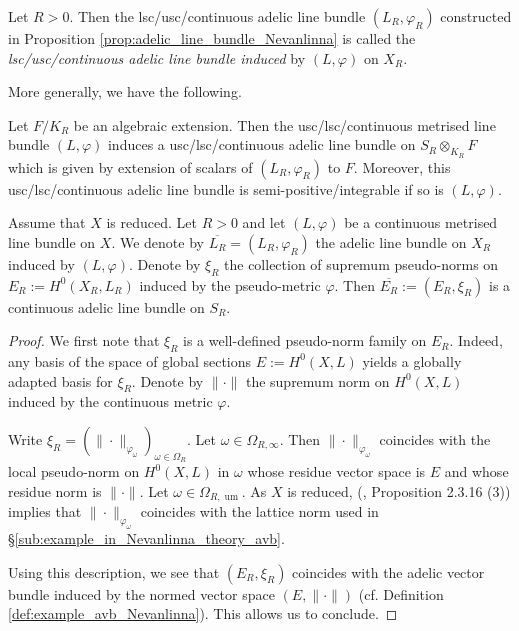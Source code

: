 \documentclass [11pt,reqno]{amsart}
\newcommand{\1}{\mathmybb{1}}
\def\um{\operatorname{um}}
\begin{document}
\begin{definition}
\label{def:adelic_line_bundle_Nevanlinna}
Let $R>0$. Then the lsc/usc/continuous adelic line bundle $(L_{R},\varphi_{R})$ constructed in Proposition \ref{prop:adelic_line_bundle_Nevanlinna} is called the \emph{lsc/usc/continuous adelic line bundle induced} by $(L,\varphi)$ on $X_{R}$. 
\end{definition}

More generally, we have the following.

\begin{proposition-definition}
\label{prop-def:adelic_line_bundle_Nevanlinna_finite covering} 
Let $F/K_{R}$ be an algebraic extension. Then the usc/lsc/continuous metrised line bundle $(L,\varphi)$ induces a usc/lsc/continuous adelic line bundle on $S_{R}\otimes_{K_{R}}F$ which is given by extension of scalars of $(L_{R},\varphi_{R})$ to $F$. Moreover, this usc/lsc/continuous adelic line bundle is semi-positive/integrable if so is $(L,\varphi)$.
\end{proposition-definition}

\begin{proposition}
\label{prop:adelic_line_bundle_Nevanlinna_pushforward}
Assume that $X$ is reduced. Let $R>0$ and let $(L,\varphi)$ be a continuous metrised line bundle on $X$. We denote by $\overline{L_R}=(L_R,\varphi_R)$ the adelic line bundle on $X_R$ induced by $(L,\varphi)$. Denote by $\xi_R$ the collection of supremum pseudo-norms on $E_R:=H^{0}(X_R,L_R)$ induced by the pseudo-metric $\varphi$. Then $\overline{E_R}:=(E_R,\xi_R)$ is a continuous adelic line bundle on $S_R$.
\end{proposition}

\begin{proof}
We first note that $\xi_R$ is a well-defined pseudo-norm family on $E_R$. Indeed, any basis of the space of global sections $E:=H^{0}(X,L)$ yields a globally adapted basis for $\xi_R$. Denote by $\|\cdot\|$ the supremum norm on $H^{0}(X,L)$ induced by the continuous metric $\varphi$.

Write $\xi_R=(\|\cdot\|_{\varphi_{\omega}})_{\omega\in\Omega_{R}}$. Let $\omega\in\Omega_{R,\infty}$. Then $\|\cdot\|_{\varphi_{\omega}}$ coincides with the local pseudo-norm on $H^{0}(X,L)$ in $\omega$ whose residue vector space is $E$ and whose residue norm is $\|\cdot\|$. Let $\omega\in \Omega_{R,\um}$. As $X$ is reduced, (\cite{ChenMori}, Proposition 2.3.16 (3)) implies that $\|\cdot\|_{\varphi_{\omega}}$ coincides with the lattice norm used in \S \ref{sub:example_in_Nevanlinna_theory_avb}. 

Using this description, we see that $(E_R,\xi_R)$ coincides with the adelic vector bundle induced by the normed vector space $(E,\|\cdot\|)$ (cf. Definition \ref{def:example_avb_Nevanlinna}). This allows us to conclude.
\end{proof}
\end{document}

